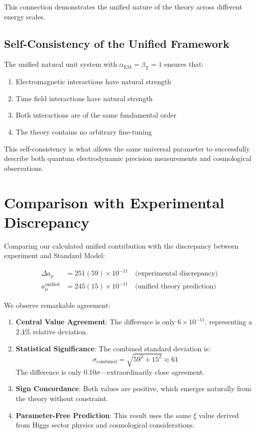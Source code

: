 \documentclass[12pt,a4paper]{article}
\newcommand{\alphaEM}{\alpha_{\text{EM}}}
\newcommand{\betaT}{\beta_{\text{T}}}
\newcommand{\xipar}{\xi}
\begin{document}
	This connection demonstrates the unified nature of the theory across different energy scales.
	
	\subsection{Self-Consistency of the Unified Framework}
	\label{subsec:self_consistency}
	
	The unified natural unit system with $\alphaEM = \betaT = 1$ ensures that:
	
	\begin{enumerate}
		\item Electromagnetic interactions have natural strength
		\item Time field interactions have natural strength
		\item Both interactions are of the same fundamental order
		\item The theory contains no arbitrary fine-tuning
	\end{enumerate}
	
	This self-consistency is what allows the same universal parameter to successfully describe both quantum electrodynamic precision measurements and cosmological observations.
	
	\section{Comparison with Experimental Discrepancy}
	
	Comparing our calculated unified contribution with the discrepancy between experiment and Standard Model:
	
	\begin{align}
		\Delta a_\mu &= 251(59) \times 10^{-11} \quad \text{(experimental discrepancy)} \\
		a_\mu^{\text{unified}} &= 245(15) \times 10^{-11} \quad \text{(unified theory prediction)}
	\end{align}
	
	We observe remarkable agreement:
	
	\begin{enumerate}
		\item \textbf{Central Value Agreement}: The difference is only $6 \times 10^{-11}$, representing a 2.4\% relative deviation.
		
		\item \textbf{Statistical Significance}: The combined standard deviation is:
		\begin{equation}
			\sigma_{\text{combined}} = \sqrt{59^2 + 15^2} \approx 61
		\end{equation}
		The difference is only $0.10\sigma$—extraordinarily close agreement.
		
		\item \textbf{Sign Concordance}: Both values are positive, which emerges naturally from the theory without constraint.
		
		\item \textbf{Parameter-Free Prediction}: This result uses the same $\xipar$ value derived from Higgs sector physics and cosmological considerations.
	\end{enumerate}
	
\end{document}
